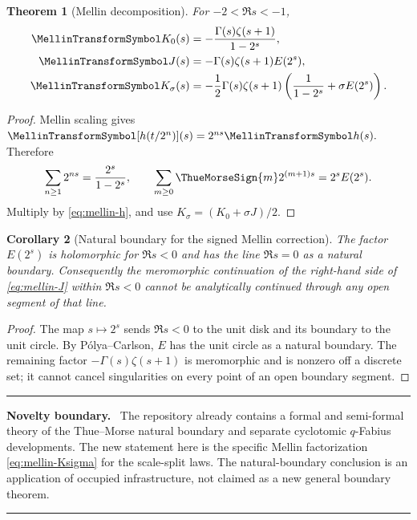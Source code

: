 \documentclass[11pt,oneside]{article}
\numberwithin{equation}{section}
\newtheorem{theorem}{Theorem}[section]
\newtheorem{corollary}[theorem]{Corollary}
\theoremstyle{definition}
\theoremstyle{remark}
\newenvironment{statusbox}[1]{%
  \par\smallskip\noindent\begin{center}\begin{minipage}{0.94\textwidth}%
  \hrule\vspace{0.55em}\textbf{#1.}\ }{%
  \vspace{0.55em}\hrule\end{minipage}\end{center}\smallskip}
\begin{document}
\begin{theorem}[Mellin decomposition]
\label{thm:mellin-decomposition}
For $-2<\Re s<-1$,
\begin{align}
 \MellinTransformSymbol K_0(s)
 &=-\frac{\Gamma(s)\zeta(s+1)}{1-2^s},
 \label{eq:mellin-K0}\\
 \MellinTransformSymbol J(s)
 &=-\Gamma(s)\zeta(s+1)E(2^s),
 \label{eq:mellin-J}\\
 \MellinTransformSymbol K_\sigma(s)
 &=-\frac12\Gamma(s)\zeta(s+1)
 \left(\frac1{1-2^s}+\sigma E(2^s)\right).
 \label{eq:mellin-Ksigma}
\end{align}
\end{theorem}

\begin{proof}
Mellin scaling gives
\(
 \MellinTransformSymbol[h(t/2^n)](s)=2^{ns}\MellinTransformSymbol h(s).
\)
Therefore
\[
 \sum_{n\ge1}2^{ns}=\frac{2^s}{1-2^s},
 \qquad
 \sum_{m\ge0}\ThueMorseSign{m}2^{(m+1)s}=2^sE(2^s).
\]
Multiply by \eqref{eq:mellin-h}, and use
$K_\sigma=(K_0+\sigma J)/2$.
\end{proof}

\begin{corollary}[Natural boundary for the signed Mellin correction]
\label{cor:mellin-boundary}
The factor $E(2^s)$ is holomorphic for $\Re s<0$ and has the line $\Re s=0$ as a natural
boundary.  Consequently the meromorphic continuation of the right-hand side of
\eqref{eq:mellin-J} within $\Re s<0$ cannot be analytically continued through any open
segment of that line.
\end{corollary}

\begin{proof}
The map $s\mapsto2^s$ sends $\Re s<0$ to the unit disk and its boundary to the unit
circle.  By P\'olya--Carlson, $E$ has the unit circle as a natural boundary.  The remaining
factor $-\Gamma(s)\zeta(s+1)$ is meromorphic and is nonzero off a discrete set; it cannot
cancel singularities on every point of an open boundary segment.
\end{proof}

\begin{statusbox}{Novelty boundary}
The repository already contains a formal and semi-formal theory of the Thue--Morse natural
boundary and separate cyclotomic $q$-Fabius developments.  The new statement here is the
specific Mellin factorization \eqref{eq:mellin-Ksigma} for the scale-split laws.  The
natural-boundary conclusion is an application of occupied infrastructure, not claimed as
a new general boundary theorem.
\end{statusbox}
\end{document}

